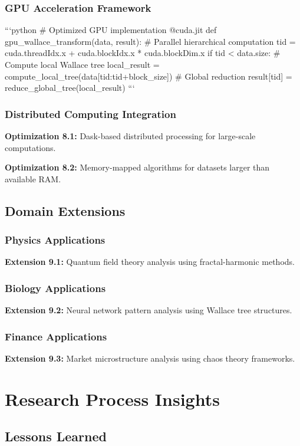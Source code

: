\documentclass[12pt]{article}
\begin{document}
\subsubsection{GPU Acceleration Framework}
```python
# Optimized GPU implementation
@cuda.jit
def gpu_wallace_transform(data, result):
    # Parallel hierarchical computation
    tid = cuda.threadIdx.x + cuda.blockIdx.x * cuda.blockDim.x
    if tid < data.size:
        # Compute local Wallace tree
        local_result = compute_local_tree(data[tid:tid+block_size])
        # Global reduction
        result[tid] = reduce_global_tree(local_result)
```

\subsubsection{Distributed Computing Integration}
\textbf{Optimization 8.1:} Dask-based distributed processing for large-scale computations.

\textbf{Optimization 8.2:} Memory-mapped algorithms for datasets larger than available RAM.

\subsection{Domain Extensions}

\subsubsection{Physics Applications}
\textbf{Extension 9.1:} Quantum field theory analysis using fractal-harmonic methods.

\subsubsection{Biology Applications}
\textbf{Extension 9.2:} Neural network pattern analysis using Wallace tree structures.

\subsubsection{Finance Applications}
\textbf{Extension 9.3:} Market microstructure analysis using chaos theory frameworks.

\section{Research Process Insights}

\subsection{Lessons Learned}
\end{document}
